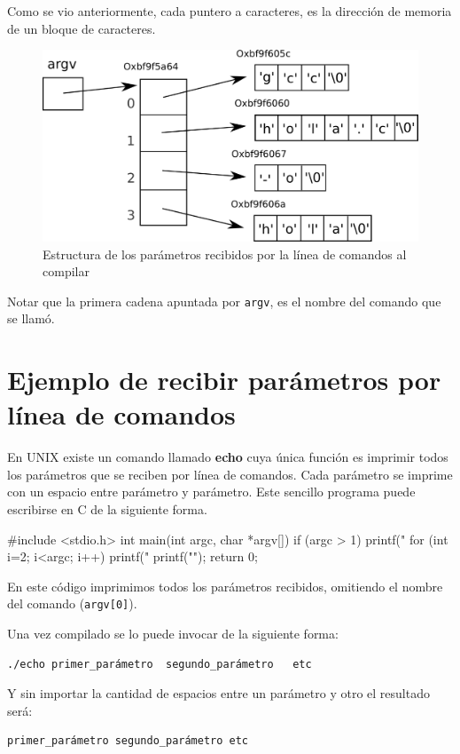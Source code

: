 Como se vio anteriormente, cada puntero a caracteres, es la dirección de
memoria de un bloque de caracteres.

\begin{figure}[htb]
\centering
\includegraphics{imagenes/parametros}
\caption{Estructura de los parámetros recibidos por la línea de comandos
al compilar}
\end{figure}

Notar que la primera cadena apuntada por \lstinline!argv!, es el nombre del
comando que se llamó.

\section{Ejemplo de recibir parámetros por línea de comandos}

En UNIX existe un comando llamado \textbf{echo} cuya única función es imprimir todos
los parámetros que se reciben por línea de comandos. Cada parámetro se imprime
con un espacio entre parámetro y parámetro. Este sencillo programa puede
escribirse en C de la siguiente forma.

\begin{codigo-c}
#include <stdio.h>
int main(int argc, char *argv[])
{
    if (argc > 1) {
        printf("%
    }
    for (int i=2; i<argc; i++) {
        printf(" %
    }
    printf("\n");
    return 0;
}
\end{codigo-c}

En este código imprimimos todos los parámetros recibidos, omitiendo el
nombre del comando (\lstinline!argv[0]!).

Una vez compilado se lo puede invocar de la siguiente forma:
    
\begin{verbatim} 
./echo primer_parámetro  segundo_parámetro   etc
\end{verbatim} 

Y sin importar la cantidad de espacios entre un parámetro y otro el resultado
será: 

\begin{verbatim} 
primer_parámetro segundo_parámetro etc
\end{verbatim}

